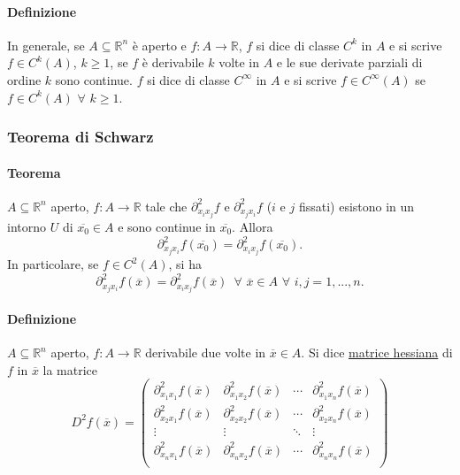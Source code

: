 \documentclass{article}
\newcommand{\R}{\mathbb{R}}
\begin{document}
\paragraph{{Definizione}} 
In generale, se $A \subseteq \R^n$ è aperto e $f:A\rightarrow\R$, $f$ si dice di classe $C^k$ in $A$ e si scrive $f \in C^k(A)$, $k \geq 1$, se $f$ è derivabile $k$ volte in $A$ e le sue derivate parziali di ordine $k$ sono continue. $f$ si dice di classe $C^\infty$ in $A$ e si scrive $f \in C^\infty(A)$ se $f\in C^k(A) \,\, \forall \,\, k \geq 1$.

\subsubsection{{Teorema di Schwarz}}
\paragraph{{Teorema}}
$A \subseteq\R^n$ aperto, $f:A\rightarrow\R$ tale che $\partial_{x_ix_j}^2f$ e $\partial_{x_jx_i}^2f$ ($i$ e $j$ fissati) esistono in un intorno $U$ di $\overline{x_0}\in A$ e sono continue in $\overline{x_0}$. Allora
\begin{equation*}
    \partial_{x_jx_i}^2f(\overline{x_0})=\partial_{x_ix_j}^2f(\overline{x_0}).
\end{equation*}
In particolare, se $f \in C^2(A)$, si ha 
\begin{equation*}
     \partial_{x_jx_i}^2f(\overline{x})=\partial_{x_ix_j}^2f(\overline{x})\,\,\, \forall\,\, \overline{x} \in A\,\, \forall \,\,i,j=1,...,n. 
\end{equation*}  

\paragraph{{Definizione}}
$A \subseteq \R^n$ aperto, $f: A \rightarrow \R$ derivabile due volte in $\overline{x}\in A$. Si dice \underline{matrice hessiana} di $f$ in $\overline{x}$ la matrice
\begin{equation*}
    D^2f(\overline{x})=\begin{pmatrix}
        \partial_{x_1x_1}^2f(\overline{x})& \partial_{x_1x_2}^2f(\overline{x})  & \cdots & \partial_{x_1x_n}^2f(\overline{x})\\
        \partial_{x_2x_1}^2f(\overline{x})& \partial_{x_2x_2}^2f(\overline{x}) & \cdots & \partial_{x_2x_n}^2f(\overline{x})\\
        \vdots&\vdots & \ddots &\vdots \\
        \partial_{x_nx_1}^2f(\overline{x})& \partial_{x_nx_2}^2f(\overline{x})& \cdots & \partial_{x_nx_n}^2f(\overline{x}) \\
    \end{pmatrix}
\end{equation*}
\end{document}
